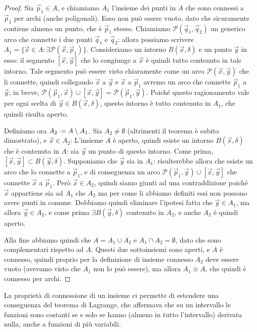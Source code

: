 \begin{proof}
	Sia $\vec p_1\in A$, e chiamiamo $A_1$ l'insieme dei punti in $A$ che sono connessi a $\vec p_1$ per archi (anche poligonali).
	Esso non può essere vuoto, dato che sicuramente contiene almeno un punto, che è $\vec p_1$ stesso.
	Chiamiamo $\mathscr P(\vec q_1,\vec q_2)$ un generico arco che connette i due punti $\vec q_1$ e $\vec q_2$: allora possiamo scrivere $A_1=\{\vec x\in A\colon\exists\mathscr P(\vec x,\vec p_1)\}$.
	Consideriamo un intorno $B(\vec x,\delta)$ e un punto $\vec y$ in esso: il segmento $[\vec x,\vec y]$ che lo congiunge a $\vec x$ è quindi tutto contenuto in tale intorno.
	Tale segmento può essere visto chiaramente come un arco $\mathscr P(\vec x,\vec y)$ che li connette, quindi collegando $\vec x$ a $\vec y$ e $\vec x$ a $\vec p_1$ avremo un arco che connette $\vec p_1$ a $\vec y$; in breve, $\mathscr P(\vec p_1,\vec x)\cup[\vec x,\vec y]=\mathscr P(\vec p_1,\vec y)$.
	Poich\'e questo ragionamento vale per ogni scelta di $\vec y\in B(\vec x,\delta)$, questo intorno è tutto contenuto in $A_1$, che quindi risulta aperto.

	Definiamo ora $A_2\defeq A\setminus A_1$.
	Sia $A_2\neq\emptyset$ (altrimenti il teorema è subito dimostrato), e $\vec x\in A_2$: L'insieme $A$ è aperto, quindi esiste un intorno $B(\vec x,\delta)$ che è contenuto in $A$: sia $\vec y$ un punto di questo intorno.
	Come prima, $[\vec x,\vec y]\subset B(\vec y,\delta)$.
	Supponiamo che $\vec y$ sia in $A_1$: risulterebbe allora che esiste un arco che lo connette a $\vec p_1$, e di conseguenza un arco $\mathscr P(\vec p_1,\vec y)\cup[\vec x,\vec y]$ che connette $\vec x$ a $\vec p_1$.
	Però $\vec x\in A_2$, quindi siamo giunti ad una contraddizione poiché $\vec x$ appartiene sia ad $A_1$ che $A_2$ ma per come li abbiamo definiti essi non possono avere punti in comune.
	Dobbiamo quindi eliminare l'ipotesi fatta che $\vec y\in A_1$, ma allora $\vec y\in A_2$, e come prima $\exists B(\vec y,\delta)$ contenuto in $A_2$, e anche $A_2$ è quindi aperto.

	Alla fine abbiamo quindi che $A=A_1\cup A_2$ e $A_1\cap A_2=\emptyset$, dato che sono complementari rispetto ad $A$.
	Questi due sottoinsiemi sono aperti, e $A$ è connesso, quindi proprio per la definizione di insieme connesso $A_2$ deve essere vuoto (avevamo visto che $A_1$ non lo può essere), ma allora $A_1\equiv A$, che quindi è connesso per archi.
\end{proof}
La proprietà di connessione di un insieme ci permette di estendere una conseguenza del teorema di Lagrange, che affermava che su un intervallo le funzioni sono costanti se e solo se hanno (almeno in tutto l'intervallo) derivata nulla, anche a funzioni di più variabili.
